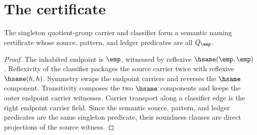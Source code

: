 \section{The certificate}
\label{sec:quotientgroup-certificate}

\begin{theorem}
\label{thm:quotientgroup-singleton-semantic-namecert}
The singleton quotient-group carrier and classifier form a semantic naming
certificate whose source, pattern, and ledger predicates are all
$Q_{\emp}$.
\end{theorem}
\begin{proof}
The inhabited endpoint is $\emp$, witnessed by reflexive
$\hsame(\emp,\emp)$. Reflexivity of the classifier packages the source carrier
twice with reflexive $\hsame(h,h)$. Symmetry swaps the endpoint carriers and
reverses the $\hsame$ component. Transitivity composes the two $\hsame$
components and keeps the outer endpoint carrier witnesses. Carrier transport
along a classifier edge is the right endpoint carrier field. Since the semantic
source, pattern, and ledger predicates are the same singleton predicate, their
soundness clauses are direct projections of the source witness.
\end{proof}


